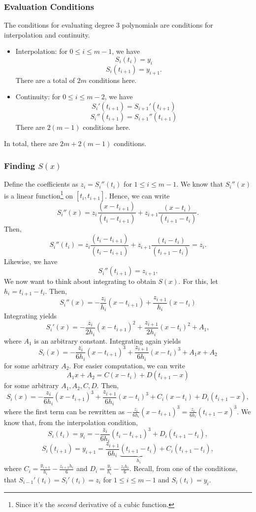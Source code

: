 \documentclass[letterpaper]{article}
\begin{document}
\subsubsection{Evaluation Conditions}
The conditions for evaluating degree 3 polynomials are conditions for interpolation and continuity.
\begin{itemize}
    \item Interpolation: for $0 \leq i \leq m - 1$, we have  
    \[S_{i}(t_i) = y_i\]
    \[S_{i}(t_{i + 1}) = y_{i + 1}.\]
    There are a total of $2m$ conditions here. 

    \item Continuity: for $0 \leq i \leq m - 2$, we have 
    \[S_{i}'(t_{i + 1}) = S_{i + 1}'(t_{i + 1})\]
    \[S_{i}''(t_{i + 1}) = S_{i + 1}''(t_{i + 1})\]
    There are $2(m - 1)$ conditions here.
\end{itemize}
In total, there are $2m + 2(m - 1)$ conditions. 

\subsubsection{Finding \texorpdfstring{$S(x)$}{S(x)}}

Define the coefficients as $z_i = S_{i}''(t_i)$ for $1 \leq i \leq m - 1$. We know that $S_{i}''(x)$ is a linear function\footnote{Since it's the \emph{second} derivative of a cubic function.} on $[t_i, t_{i + 1}]$. Hence, we can write 
\[S_{i}''(x) = z_i \frac{(x - t_{i + 1})}{(t_i - t_{i + 1})} + z_{i + 1}\frac{(x - t_i)}{(t_{i + 1} - t_i)}.\]
Then, 
\[S_{i}''(t_i) = z_i \frac{(t_i - t_{i + 1})}{(t_i - t_{i + 1})} + z_{i + 1}\frac{(t_i - t_i)}{(t_{i + 1} - t_i)} = z_i.\]
Likewise, we have 
\[S_{i}''(t_{i + 1}) = z_{i + 1}.\]
We now want to think about integrating to obtain $S(x)$. For this, let $h_i = t_{i + 1} - t_i$. Then,
\[S_{i}''(x) = -\frac{z_i}{h_i}(x - t_{i + 1}) + \frac{z_{i + 1}}{h_i}(x - t_i)\]
Integrating yields
\[S_{i}'(x) = -\frac{z_i}{2h_i}(x - t_{i + 1})^2 + \frac{z_{i + 1}}{2h_i}(x - t_i)^2 + A_1,\]
where $A_1$ is an arbitrary constant. Integrating again yields  
\[S_i (x) = -\frac{z_i}{6h_i}(x - t_{i + 1})^3 + \frac{z_{i + 1}}{6h_i} (x - t_i)^3 + A_1 x + A_2\]
for some arbitrary $A_2$. For easier computation, we can write 
\[A_1 x + A_2 = C (x - t_i) + D (t_{i + 1} - x)\]
for some arbitrary $A_1, A_2, C, D$. Then, 
\[\boxed{S_{i}(x) = -\frac{z_i}{6h_i}(x - t_{i + 1})^3 + \frac{z_{i + 1}}{6h_i} (x - t_i)^3 + C_i (x - t_i) + D_i (t_{i + 1} - x)},\]
where the first term can be rewritten as $-\frac{z_i}{6h_i}(x - t_{i + 1})^3 = \frac{z_i}{6h_i}(t_{i + 1} - x)^3$. We know that, from the interpolation condition, 
\[S_{i}(t_i) = y_i = -\frac{z_i}{6h_i} (t_i - t_{i + 1})^3 + D_i(t_{i + 1} - t_i),\]
\[S_{i}(t_{i + 1}) = y_{i + 1} = \frac{z_{i + 1}}{6h_i} \underbrace{(t_{i + 1} - t_i)}_{h_i} + C_i(t_{i + 1} - t_i),\]
where $C_i = \frac{y_{i + 1}}{h_i} - \frac{z_{i + 1} h_i}{6}$ and $D_i = \frac{y_i}{h_i} - \frac{z_i h_i}{6}$. Recall, from one of the conditions, that $S_{i - 1}'(t_i) = S_{i}'(t_i) = z_i$ for $1 \leq i \leq m - 1$ and $S_{i}(t_i) = y_i$.
\end{document}
